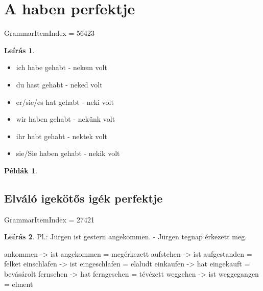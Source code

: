 \documentclass{article}
\theoremstyle{definition}
\newtheorem*{exmp}{Példák}
\newtheorem*{desc}{Leírás}
\begin{document}
\section{A haben perfektje}

GrammarItemIndex = 56423

\begin{desc}
\begin{itemize}
\item ich habe gehabt - nekem volt
\item du hast gehabt - neked volt
\item er/sie/es hat gehabt - neki volt
\item wir haben gehabt - nekünk volt
\item ihr habt gehabt - nektek volt
\item sie/Sie haben gehabt - nekik volt
\end{itemize}
\end{desc}

\begin{exmp}
\end{exmp}

\subsection{Elváló igekötős igék perfektje}

GrammarItemIndex = 27421

\begin{desc}
Pl.: Jürgen ist gestern angekommen. - Jürgen tegnap érkezett meg.

ankommen -> ist angekommen = megérkezett
aufstehen -> ist aufgestanden = felket
einschlafen -> ist eingeschlafen = elaludt
einkaufen -> hat eingekauft = bevásárolt
fernsehen -> hat ferngesehen = tévézett
weggehen -> ist weggegangen = elment
\end{desc}
\end{document}

